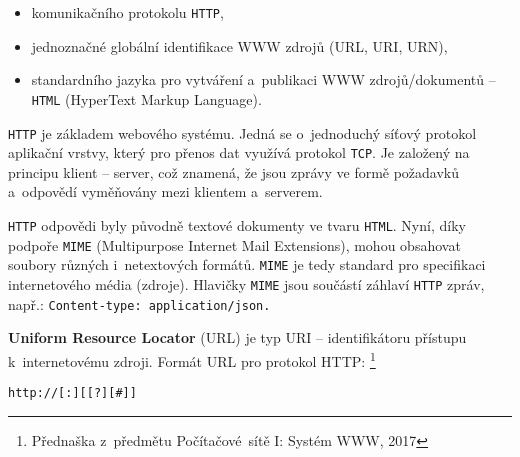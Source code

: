 \documentclass[twoside, 12pt]{article}
\begin{document}
\begin{itemize}
\item komunikačního protokolu \texttt{HTTP},
\item jednoznačné globální identifikace WWW zdrojů (URL, URI, URN),
\item standardního jazyka pro vytváření a~publikaci WWW zdrojů/dokumentů -- \texttt{HTML}
(HyperText Markup Language).
\end{itemize}

\obrazek
{}

\texttt{HTTP} je základem webového systému.
Jedná se o~jednoduchý síťový protokol aplikační vrstvy,
který pro přenos dat využívá protokol \texttt{TCP}.
Je založený na principu klient -- server,
což znamená, že jsou zprávy ve formě požadavků a~odpovědí vyměňovány mezi klientem
a~serverem.

\texttt{HTTP} odpovědi byly původně textové dokumenty ve tvaru \texttt{HTML}.
Nyní, díky podpoře \texttt{MIME} (Multipurpose Internet Mail Extensions),
mohou obsahovat soubory různých i~netextových formátů.
\texttt{MIME} je tedy standard pro specifikaci internetového média (zdroje).
Hlavičky \texttt{MIME} jsou součástí záhlaví \texttt{HTTP} zpráv, např.: \texttt{Content-type:~application/json.}

\textbf{Uniform Resource Locator} (URL) je typ URI -- identifikátoru přístupu k~internetovému zdroji.
Formát URL pro protokol HTTP:
\footnote{Přednaška z~předmětu Počítačové~sítě I: Systém WWW, 2017}

\bigskip
\texttt{http://[:][[?][\#]]}

\bigskip
\end{document}
